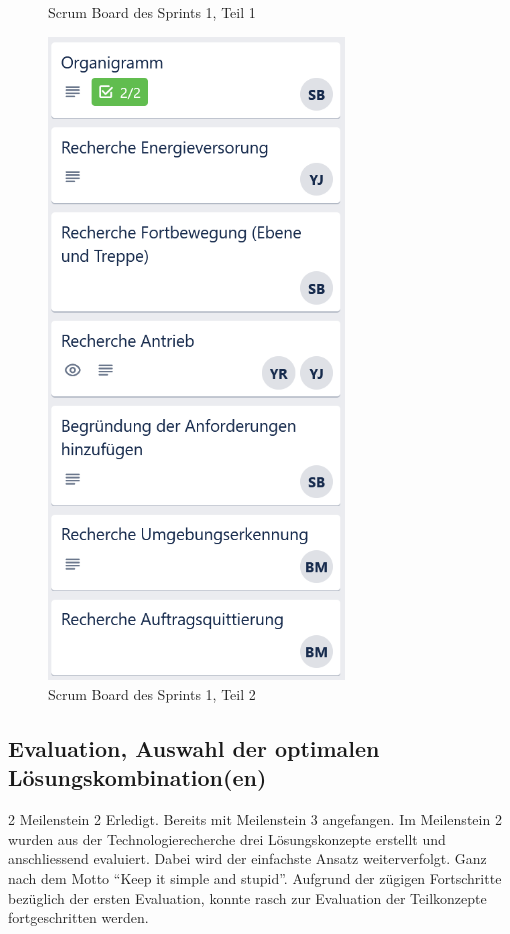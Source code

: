 \begin{figure}[H]
\begin{minipage}[t]{0.45\linewidth}
  \caption{Scrum Board des Sprints 1, Teil 1}
  \label{Scrum Board 2.1}
  \end{minipage} 
  \hfill
  \begin{minipage}[t]{0.45\linewidth}
  \includegraphics[width=0.7\textwidth]{img/Trello/Trello-Bord_1_Nr2.PNG}
  \caption{Scrum Board des Sprints 1, Teil 2}
  \label{Scrum Board 2.2}
  \end{minipage}
\end{figure}

\subsection*{Evaluation, Auswahl der optimalen Lösungskombination(en)}
\workday
    {2}
    {\ok Meilenstein 2 Erledigt. Bereits mit Meilenstein 3 angefangen.}
    {
      Im Meilenstein 2 wurden aus der Technologierecherche drei Lösungskonzepte erstellt
      und anschliessend evaluiert. Dabei wird der einfachste Ansatz weiterverfolgt. 
      Ganz nach dem Motto ``Keep it simple and stupid''.
    }
    {
      Aufgrund der zügigen Fortschritte bezüglich der ersten Evaluation, konnte rasch zur Evaluation der Teilkonzepte fortgeschritten werden.
    }

